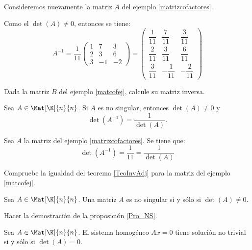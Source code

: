 \documentclass[compacto,10pt]{pubciencias-notas}
\begin{document}
\begin{ejem}
    Consideremos nuevamente la matriz $A$ del ejemplo \ref{matrizcofactores}.
    
    \noindent Como el $\det(A) \not = 0$, entonces se tiene:
    \[
        A^{-1} = \dfrac{1}{11}
        \begin{pmatrix}
            1 & 7 & 3 \\
            2 & 3 & 6 \\
            3 & -1 & -2
        \end{pmatrix} = 
        \begin{pmatrix}
            \dfrac{1}{11} & \dfrac{7}{11} & \dfrac{3}{11} \\
            \dfrac{2}{11} & \dfrac{3}{11} & \dfrac{6}{11} \\
            \dfrac{3}{11} & -\dfrac{1}{11} & -\dfrac{2}{11}
        \end{pmatrix}
    \]
\end{ejem}

\begin{ejer} Dada la matriz $B$ del ejemplo \ref{matcofej}, calcule su matriz inversa.
\end{ejer}

\begin{teo}\label{TeoInvAdj}
    Sea $A \in \Mat[\K]{n}{n}$. Si $A$ es no singular, entonces $\det(A) \neq 0$ y 
    \[
        \det(A^{-1}) = \dfrac{1}{\det(A)}.
    \]
\end{teo}

\begin{ejem}
    Sea $A$ la matriz del ejemplo \ref{matrizcofactores}. Se tiene que:
    \[
        \det(A^{-1}) = \dfrac{1}{11} = \dfrac{1}{\det(A)}
    \]
\end{ejem}

\begin{ejer} Compruebe la igualdad del teorema \ref{TeoInvAdj} para la matriz del ejemplo \ref{matcofej}.
\end{ejer}

\begin{prop}\label{Pro_NS}
Sea $A\in\Mat[\K]{n}{n}$. Una matriz $A$ es no singular si y sólo si $\det(A)\neq0$.
\end{prop}

\begin{ejer} Hacer la demostración de la proposición \ref{Pro_NS}.
\end{ejer}

\begin{prop}
Sea $A\in\Mat[\K]{n}{n}$. El sistema homogéneo $Ax=0$ tiene solución no trivial si y sólo si $\det(A)=0$.
\end{prop}
\end{document}
